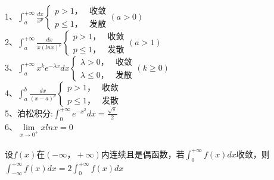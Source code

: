 \documentclass{article}
\begin{document}
\begin{flushleft}
	1、$\int_{a}^{+\infty}\frac{dx}{x^p}\left\{
	\begin{array}{lcl}
	p>1， & \mbox{收敛}\\
	p\le 1， & \mbox{发散}
	\end{array} \right.(a>0)$\\
	2、$\int_{a}^{+\infty}\frac{dx}{x(lnx)^p}\left\{
	\begin{array}{lcl}
	p>1， & \mbox{收敛}\\
	p\le 1， & \mbox{发散}
	\end{array} \right.(a>1)$\\
	3、$\int_{a}^{+\infty}x^ke^{-\lambda x}dx\left\{
	\begin{array}{lcl}
	\lambda>0， & \mbox{收敛}\\
	\lambda\le 0， & \mbox{发散}
	\end{array} \right.(k\ge 0)$\\
	4、$\int_{a}^{b}\frac{dx}{(x-a)^p}\left\{
	\begin{array}{lcl}
	p>1， & \mbox{收敛}\\
	p\le 1， & \mbox{发散}
	\end{array} \right.$\\
	5、泊松积分:$\int_{0}^{+\infty}e^{-x^2}dx=\frac{\sqrt{\pi}}{2}$\\
	6、$\lim\limits_{x\to 0^+}xlnx=0$\\
	~\\
	设$f(x)$在$(-\infty，+\infty)$内连续且是偶函数，若$\int_{0}^{+\infty}f(x)dx$收敛，则$\int_{-\infty}^{+\infty}f(x)dx=2\int_{0}^{+\infty}f(x)dx$\\
	
\end{flushleft}
\end{document}
